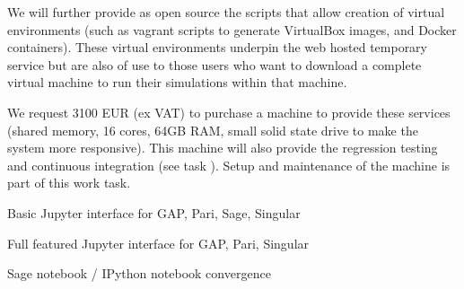\begin{workpackage}
\begin{tasklist}
\begin{task}[id=oommf-nb-ve,title=OOMMF case study: \OOMMFNB{} virtual environments]
  We will further provide as open source the scripts that allow
  creation of virtual environments (such as vagrant scripts to
  generate VirtualBox images, and Docker containers). These virtual
  environments underpin the web hosted temporary \OOMMFNB{}
  service but are also of use to those users who want to download a
  complete virtual machine to run their simulations within that
  machine.

  We request 3100 EUR (ex VAT) to purchase a machine to provide these
  services (shared memory, 16 cores, 64GB RAM, small solid state drive
  to make the system more responsive). This machine will also provide
  the regression testing and continuous integration (see task
  ). Setup and
  maintenance of the machine is part of this work task.
\end{task}

\end{tasklist}

\begin{wpdelivs}
  \begin{wpdeliv}[due=12,id=ipython-kernels-basic,dissem=PU,nature=O]
      {Basic Jupyter interface for GAP, Pari, Sage, Singular}
\end{wpdeliv}
  \begin{wpdeliv}[due=12,id=ipython-kernels,dissem=PU,nature=O]
      {Full featured Jupyter interface for GAP, Pari, Singular}
\end{wpdeliv}
  \begin{wpdeliv}[due=12,id=ipython-kernel-sage,dissem=PU,nature=DEM]
      {Sage notebook / IPython notebook convergence}
\end{wpdeliv}


\end{wpdelivs}
\end{workpackage}
